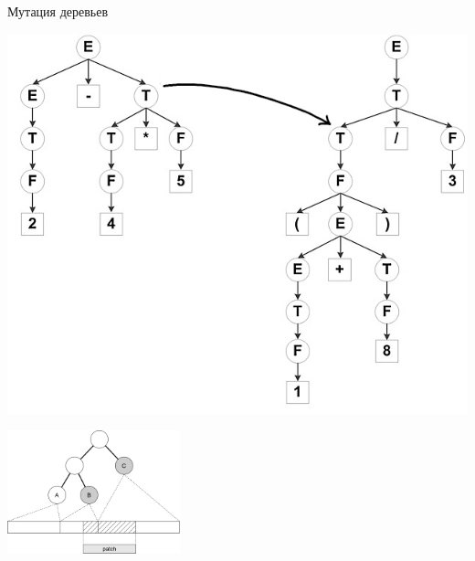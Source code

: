 \documentclass[hyperref={unicode=true}, 12pt]{beamer}
\begin{document}
	\begin{frame}[t]{Мутация деревьев}
		\begin{minipage}{0.5\textwidth}
			
			\vspace{1.5cm}
			
			\includegraphics{tree-mutate.png}
			
		\end{minipage}\begin{minipage}{0.5\textwidth}
			
			\includegraphics[width=5cm]{tree-modification.png}
		\end{minipage}
	\end{frame}
\end{document}
